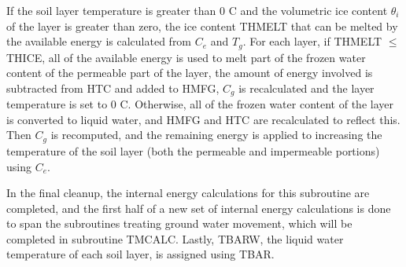 If the soil layer temperature is greater than 0 C and the volumetric ice content $\theta_i$ of the layer is greater than zero, the ice content T\+H\+M\+E\+L\+T that can be melted by the available energy is calculated from $C_e$ and $T_g$. For each layer, if T\+H\+M\+E\+L\+T $\leq$ T\+H\+I\+C\+E, all of the available energy is used to melt part of the frozen water content of the permeable part of the layer, the amount of energy involved is subtracted from H\+T\+C and added to H\+M\+F\+G, $C_g$ is recalculated and the layer temperature is set to 0 C. Otherwise, all of the frozen water content of the layer is converted to liquid water, and H\+M\+F\+G and H\+T\+C are recalculated to reflect this. Then $C_g$ is recomputed, and the remaining energy is applied to increasing the temperature of the soil layer (both the permeable and impermeable portions) using $C_e$.

In the final cleanup, the internal energy calculations for this subroutine are completed, and the first half of a new set of internal energy calculations is done to span the subroutines treating ground water movement, which will be completed in subroutine T\+M\+C\+A\+L\+C. Lastly, T\+B\+A\+R\+W, the liquid water temperature of each soil layer, is assigned using T\+B\+A\+R.